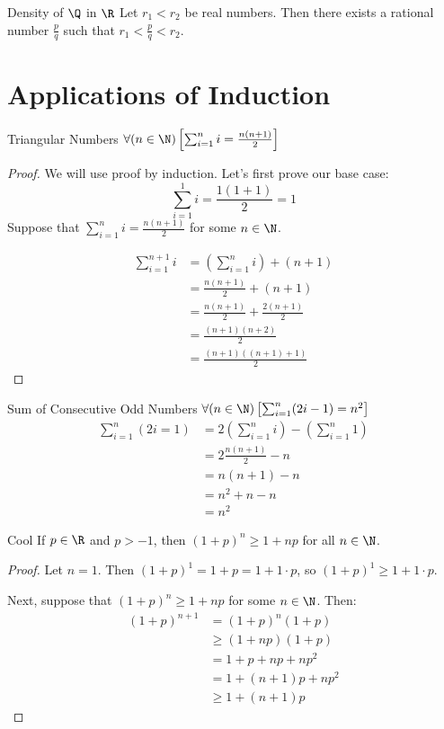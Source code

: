 \documentclass[letterpaper,12pt]{report}
\begin{document}
\begin{thmbox}{Density of $\Q$ in $\R$}{}
	Let $r_1 < r_2$ be real numbers. Then there exists a rational number $\frac{p}{q}$ such that $r_1 < \frac{p}{q} < r_2$.
	\tcblower

\end{thmbox}
\fi

\section{Applications of Induction}

\begin{exbox}{Triangular Numbers}{}
	$\forall (n \in \N) \left[ \sum_{i=1}^{n} i = \frac{n(n+1)}{2} \right]$
	\tcblower
	\begin{proof}
		We will use proof by induction. Let's first prove our base case:
		$$\sum_{i=1}^{1}{i} = \frac{1(1+1)}{2} = 1$$
		Suppose that $\sum_{i=1}^{n}i = \frac{n(n+1)}{2}$ for some $n \in \N$.

		\begin{align*}
			\sum_{i=1}^{n+1}i &= \left( \sum_{i=1}^{n} i \right) + (n+1) \\
			&= \frac{n(n+1)}{2} + (n+1) \\
			&= \frac{n(n+1)}{2} + \frac{2(n+1)}{2} \\
			&= \frac{(n+1)(n+2)}{2} \\
			&= \frac{(n+1)((n+1)+1)}{2}
		\end{align*}
	\end{proof}
\end{exbox}

\begin{exbox}{Sum of Consecutive Odd Numbers}{}
	$\forall (n \in \N) \left[ \sum_{i=1}^{n} (2i-1) = n^2 \right]$
	\tcblower
	\begin{align*}
		\sum_{i=1}^n (2i=1) &= 2 \left( \sum_{i=1}^n i \right) - \left( \sum_{i=1}^n 1 \right) \\
		&= 2 \frac{n(n+1)}{2} - n \\
		&= n(n+1)-n \\
		&= n^2 + n - n \\
		&= n^2
	\end{align*}
\end{exbox}

\begin{exbox}{Cool}{}
	If $p \in \R$ and $p > -1$, then $(1+ p)^n \geq 1+np$ for all $n \in \N$.
	\tcblower
	\begin{proof}
		Let $n=1$. Then $(1+p)^1 = 1+p = 1+1\cdot p$, so $(1+p)^1 \geq 1 + 1 \cdot p$.

		Next, suppose that $(1+p)^n \geq 1+np$ for some $n \in \N$. Then:
		\begin{align*}
			(1+p)^{n+1} &= (1+p)^n (1+p)\\
			&\geq (1+np)(1+p) \\
			&= 1 + p + np + np^2 \\
			&= 1 + (n+1)p + np^2 \\
			&\geq 1 + (n+1)p
		\end{align*}
	\end{proof}
\end{exbox}
\end{document}
